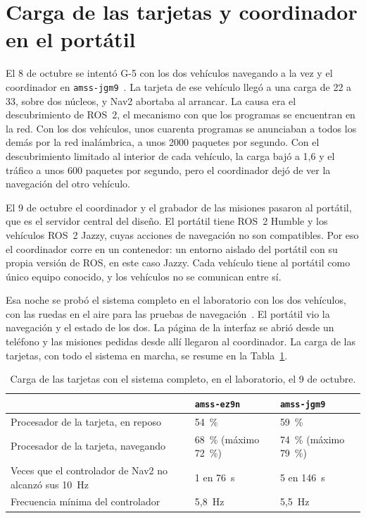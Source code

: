 \documentclass[12pt,letterpaper]{article}
\begin{document}
\section{Carga de las tarjetas y coordinador en el portátil}

El 8 de octubre se intentó G-5 con los dos vehículos navegando a la vez y el coordinador en \texttt{amss-jgm9}~\cite{estado}. La tarjeta de ese vehículo llegó a una carga de 22 a 33, sobre dos núcleos, y Nav2 abortaba al arrancar. La causa era el descubrimiento de ROS~2, el mecanismo con que los programas se encuentran en la red. Con los dos vehículos, unos cuarenta programas se anunciaban a todos los demás por la red inalámbrica, a unos 2000 paquetes por segundo. Con el descubrimiento limitado al interior de cada vehículo, la carga bajó a 1,6 y el tráfico a unos 600 paquetes por segundo, pero el coordinador dejó de ver la navegación del otro vehículo.

El 9 de octubre el coordinador y el grabador de las misiones pasaron al portátil, que es el servidor central del diseño. El portátil tiene ROS~2 Humble y los vehículos ROS~2 Jazzy, cuyas acciones de navegación no son compatibles. Por eso el coordinador corre en un contenedor: un entorno aislado del portátil con su propia versión de ROS, en este caso Jazzy. Cada vehículo tiene al portátil como único equipo conocido, y los vehículos no se comunican entre sí.

Esa noche se probó el sistema completo en el laboratorio con los dos vehículos, con las ruedas en el aire para las pruebas de navegación~\cite{laboratorio}. El portátil vio la navegación y el estado de los dos. La página de la interfaz se abrió desde un teléfono y las misiones pedidas desde allí llegaron al coordinador. La carga de las tarjetas, con todo el sistema en marcha, se resume en la Tabla~\ref{tab:carga}.

\begin{table}[H]
    \centering
    \small
    \caption{Carga de las tarjetas con el sistema completo, en el laboratorio, el 9 de octubre.}
    \label{tab:carga}
    \begin{tabular}{@{}p{6.6cm}p{3.6cm}p{3.6cm}@{}}
        \toprule
        & \texttt{amss-ez9n} & \texttt{amss-jgm9} \\ \midrule
        Procesador de la tarjeta, en reposo & 54~\% & 59~\% \\
        Procesador de la tarjeta, navegando & 68~\% (máximo 72~\%) & 74~\% (máximo 79~\%) \\
        Veces que el controlador de Nav2 no alcanzó sus 10~Hz & 1 en 76~s & 5 en 146~s \\
        Frecuencia mínima del controlador & 5,8~Hz & 5,5~Hz \\ \bottomrule
    \end{tabular}
\end{table}
\end{document}
